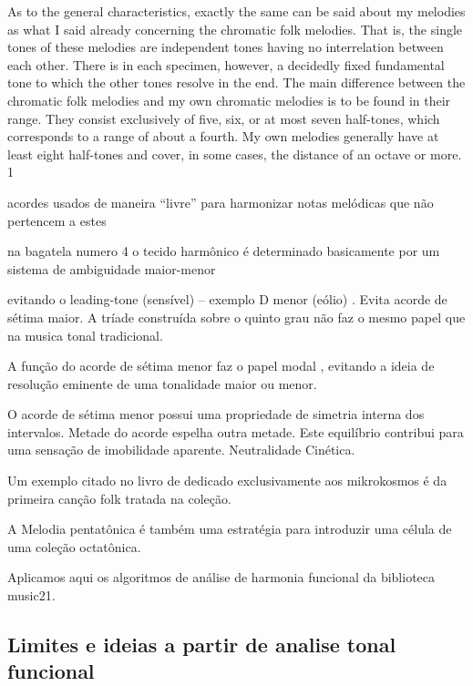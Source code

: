 \documentclass[
	12pt,				%
	openright,			%
	twoside,			%
	a4paper,			%
	english,			%
	french,				%
	spanish,			%
	brazil				%
	]{abntex2}
\begin{document}
As to the general characteristics, exactly the same can be said about my melodies as what I said already
concerning the chromatic folk melodies. That is, the single tones of these melodies are independent tones
having no interrelation between each other. There is in each specimen, however, a decidedly fixed
fundamental tone to which the other tones resolve in the end. The main difference between the chromatic folk
melodies and my own chromatic melodies is to be found in their range. They consist exclusively of five, six, or
at most seven half-tones, which corresponds to a range of about a fourth. My own melodies generally have at
least eight half-tones and cover, in some cases, the distance of an octave or more. 1
\cite[ p.6]{gillies1983bartok}










acordes usados de maneira “livre” para harmonizar notas melódicas que não pertencem a estes

na bagatela numero 4 o tecido harmônico é determinado basicamente por um sistema de ambiguidade maior-menor 

evitando o leading-tone (sensível) – exemplo D menor (eólio) . Evita acorde de sétima maior. 
A tríade construída sobre o quinto grau não faz o mesmo papel que na musica tonal tradicional.

A função do acorde de sétima menor faz o papel modal , evitando a ideia de resolução eminente de uma tonalidade maior ou menor.

O acorde de sétima menor possui uma propriedade de simetria interna dos intervalos. Metade do acorde espelha outra metade. Este equilíbrio contribui para uma sensação de imobilidade aparente. Neutralidade Cinética.



Um exemplo citado no livro de   dedicado exclusivamente aos mikrokosmos é da primeira canção folk tratada na coleção.

A Melodia pentatônica é também uma estratégia para introduzir uma célula de uma coleção octatônica.

Aplicamos aqui os algoritmos de análise de harmonia funcional da biblioteca music21.

\subsection{Limites e ideias a partir de analise tonal funcional}
\label{Prolongamento}
\end{document}
